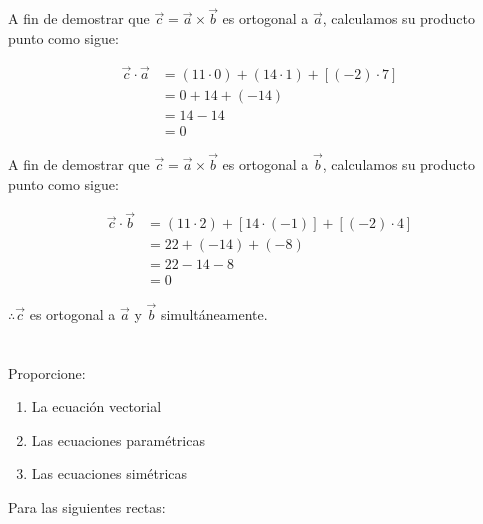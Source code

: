 \documentclass[12pt]{article}
\begin{document}
\begin{itemize}
  A fin de demostrar que $\vec{c} = \vec{a} \times \vec{b}$ es ortogonal a $\vec{a}$, calculamos su producto punto como sigue:
  
  \begin{equation*}
    \begin{split}
      \vec{c} \cdot \vec{a}
      &= (11 \cdot 0) + (14 \cdot 1) +[(-2) \cdot 7] \\
      &= 0 + 14 + (-14) \\
      &= 14 - 14 \\
      &= 0
    \end{split}
  \end{equation*}

  A fin de demostrar que $\vec{c} = \vec{a} \times \vec{b}$ es ortogonal a $\vec{b}$, calculamos su producto punto como sigue:
  
  \begin{equation*}
    \begin{split}
      \vec{c} \cdot \vec{b}
      &= (11 \cdot 2) + [14 \cdot (-1)] + [(-2) \cdot 4] \\
      &= 22 + (-14) + (-8) \\
      &= 22-14-8 \\
      &= 0
    \end{split}
  \end{equation*}

  $\therefore \vec{c}$ es ortogonal a $\vec{a}$ y $\vec{b}$ simultáneamente.

\end{itemize}

\section{}

Proporcione:

\begin{enumerate}

\item La ecuación vectorial

\item Las ecuaciones paramétricas

\item Las ecuaciones simétricas
  
\end{enumerate}

Para las siguientes rectas:
\end{document}
